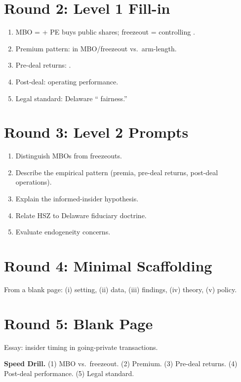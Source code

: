 \documentclass[11pt]{article}
\newcommand{\blank}[1]{\underline{\hspace{#1}}}
\begin{document}
\section*{Round 2: Level 1 Fill-in}
\begin{enumerate}
\item MBO = \blank{2cm} + PE buys public shares; freezeout = controlling \blank{2cm}.
\item Premium pattern: \blank{1cm} in MBO/freezeout vs.\ arm-length.
\item Pre-deal returns: \blank{2cm}.
\item Post-deal: \blank{2cm} operating performance.
\item Legal standard: Delaware ``\blank{2cm} fairness.''
\end{enumerate}

\section*{Round 3: Level 2 Prompts}
\begin{enumerate}
\item Distinguish MBOs from freezeouts.
\item Describe the empirical pattern (premia, pre-deal returns, post-deal operations).
\item Explain the informed-insider hypothesis.
\item Relate HSZ to Delaware fiduciary doctrine.
\item Evaluate endogeneity concerns.
\end{enumerate}

\section*{Round 4: Minimal Scaffolding}
From a blank page: (i) setting, (ii) data, (iii) findings, (iv) theory, (v) policy.

\section*{Round 5: Blank Page}
Essay: insider timing in going-private transactions.

\vspace{6pt}
\begin{drillbox}
\textbf{Speed Drill.} (1) MBO vs.\ freezeout. (2) Premium. (3) Pre-deal returns. (4) Post-deal performance. (5) Legal standard.
\end{drillbox}
\end{document}
